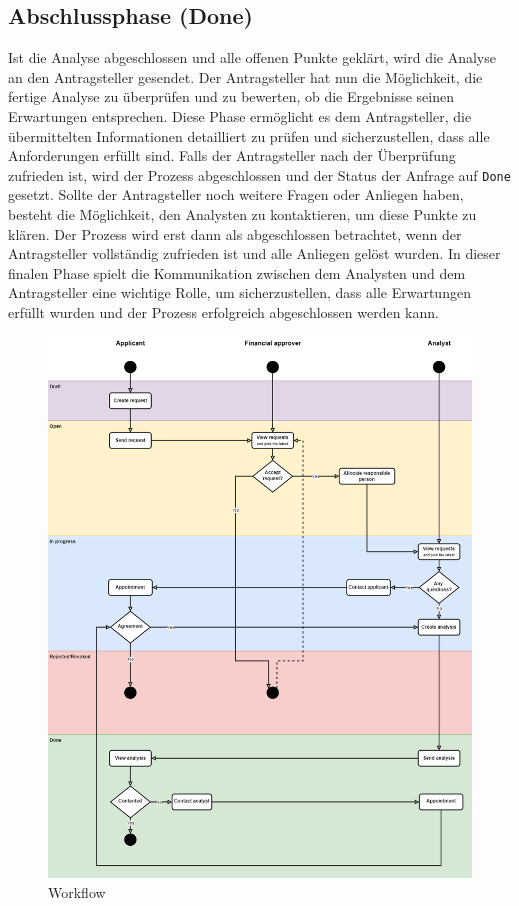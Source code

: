 \subsection*{Abschlussphase (Done)}
Ist die Analyse abgeschlossen und alle offenen Punkte geklärt, wird die Analyse an den Antragsteller gesendet. Der Antragsteller hat nun die Möglichkeit, die fertige Analyse zu überprüfen und zu bewerten, ob die Ergebnisse seinen Erwartungen entsprechen. Diese Phase ermöglicht es dem Antragsteller, die übermittelten Informationen detailliert zu prüfen und sicherzustellen, dass alle Anforderungen erfüllt sind.
\newline
Falls der Antragsteller nach der Überprüfung zufrieden ist, wird der Prozess abgeschlossen und der Status der Anfrage auf \texttt{Done} gesetzt. Sollte der Antragsteller noch weitere Fragen oder Anliegen haben, besteht die Möglichkeit, den Analysten zu kontaktieren, um diese Punkte zu klären. Der Prozess wird erst dann als abgeschlossen betrachtet, wenn der Antragsteller vollständig zufrieden ist und alle Anliegen gelöst wurden.
\newline
In dieser finalen Phase spielt die Kommunikation zwischen dem Analysten und dem Antragsteller eine wichtige Rolle, um sicherzustellen, dass alle Erwartungen erfüllt wurden und der Prozess erfolgreich abgeschlossen werden kann.
\begin{figure}[H]
    \centering
    \includegraphics[scale=.4]{media/Workflow}
    \caption{Workflow}
    \label{fig:Workflow}
\end{figure}
\newpage
